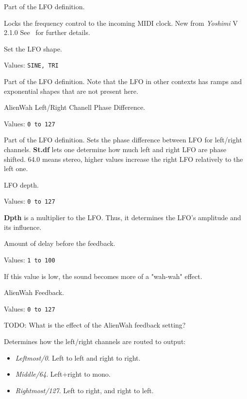    Part of the LFO definition.

   Locks the frequency control to the incoming MIDI clock. New from
   \textsl{Yoshimi} V 2.1.0 See
   \ for further details.

   Set the LFO shape.

   Values: \texttt{SINE, TRI}

   Part of the LFO definition.
   Note that the LFO in other contexts has ramps and exponential shapes that
   are not present here.

   AlienWah Left/Right Chanell Phase Difference.

   Values: \texttt{0 to 127}

   Part of the LFO definition.
   Sets the phase difference between LFO for left/right channels.
   \textbf{St.df} lets one determine how much left and right LFO are phase
   shifted.  64.0 means stereo, higher values increase the right LFO
   relatively to the left one.

   LFO depth.

   Values: \texttt{0 to 127}

   \textbf{Dpth} is a multiplier to the LFO. Thus, it determines
   the LFO's amplitude and its influence.

   Amount of delay before the feedback.

   Values: \texttt{1 to 100}

   If this value is low, the sound becomes more of a "wah-wah" effect.

   AlienWah Feedback.

   Values: \texttt{0 to 127}

   TODO: What is the effect of the AlienWah feedback setting?

   Determines how the left/right channels are routed to output:

   \begin{itemize}
      \item \textsl{Leftmost/0}. Left to left and right to right.
      \item \textsl{Middle/64}. Left+right to mono.
      \item \textsl{Rightmost/127}. Left to right, and right to left.
   \end{itemize}

